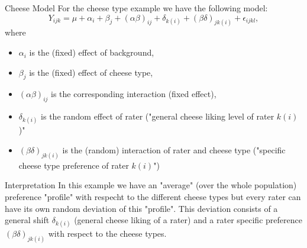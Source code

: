 \documentclass[unknownkeysallowed]{beamer}
\begin{document}
\begin{frame}{Cheese Model}
	For the cheese type example we have the following model:
	\begin{equation*}
		Y_{ijk} = \mu + \alpha_i + \beta_j + (\alpha \beta)_{ij} +\delta_{k(i)} + (\beta \delta)_{jk(i)} + \epsilon_{ijkl},
	\end{equation*}
	where
	\begin{itemize}
		\item $\alpha_i$ is the (fixed) effect of background,
		\item $\beta_j$ is the (fixed) effect of cheese type,
		\item $(\alpha \beta)_{ij}$ is the corresponding interaction (fixed effect),
		\item $\delta_{k(i)}$ is the random effect of rater ("general cheese liking level of rater $k(i)$)"
		\item $(\beta \delta)_{jk(i)}$ is the (random) interaction of rater and cheese type ("specific cheese type preference of rater $k(i)$")
	\end{itemize}
\end{frame}

\begin{frame}{Interpretation}
	In this example we have an "average" (over the whole population) preference "profile" with respecht to the different cheese types but every rater can have its own random deviation of this "profile". This deviation consists of a general shift $\delta_{k(i)}$ (general cheese liking of a rater) and a rater specific preference $(\beta \delta)_{jk(i)}$ with respect  to the cheese types.
\end{frame}
\end{document}
